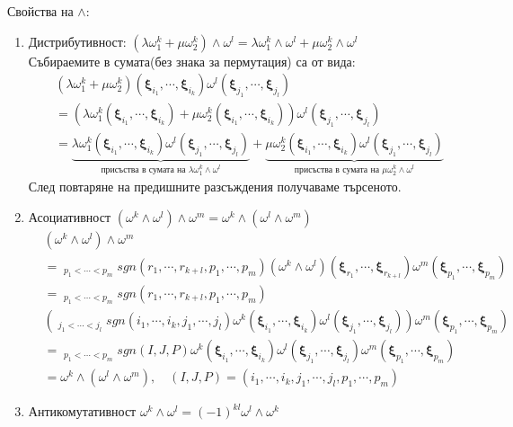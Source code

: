 \documentclass[12pt]{article}
\newcommand\myxi[0]{\boldsymbol{\xi}}
\begin{document}
\begin{large}
Свойства на $\wedge$:
\begin{enumerate}
  \item Дистрибутивност: $(\lambda\omega^k_1+\mu\omega^k_2) \wedge \omega^l = \lambda\omega^k_1\wedge\omega^l + \mu \omega^k_2\wedge\omega^l$ \\
  Събираемите в сумата(без знака за пермутация) са от вида:
  \begin{align*}
    &(\lambda\omega^k_1+\mu\omega^k_2)(\myxi_{i_1},\cdots,\myxi_{i_k})\omega^l(\myxi_{j_1},\cdots,\myxi_{j_l}) \\
    &=(\lambda\omega^k_1(\myxi_{i_1},\cdots,\myxi_{i_k})+\mu\omega^k_2(\myxi_{i_1},\cdots,\myxi_{i_k}))\omega^l(\myxi_{j_1},\cdots,\myxi_{j_l}) \\
    &=\underbrace{\lambda\omega^k_1(\myxi_{i_1},\cdots,\myxi_{i_k})\omega^l(\myxi_{j_1},\cdots,\myxi_{j_l})}_{\text{присъства в сумата на $\lambda\omega^k_1\wedge\omega^l$}}+
    \underbrace{\mu\omega^k_2(\myxi_{i_1},\cdots,\myxi_{i_k})\omega^l(\myxi_{j_1},\cdots,\myxi_{j_l})}_{\text{присъства в сумата на $\mu\omega^k_2\wedge\omega^l$}}
  \end{align*}
  След повтаряне на предишните разсъждения получаваме търсеното.
  \item Асоциативност $(\omega^k \wedge \omega^l) \wedge \omega^m=\omega^k \wedge (\omega^l \wedge \omega^m)$
  \begin{align*}
    &(\omega^k \wedge \omega^l) \wedge \omega^m  \\
    &=\mathop{\sum_{r_1<\cdots<r_{k+l}}}_{p_1<\cdots<p_m} sgn(r_1,\cdots,r_{k+l},p_1, \cdots,p_m)(\omega^k \wedge \omega^l)(\myxi_{r_1},\cdots,\myxi_{r_{k+l}})\omega^m(\myxi_{p_1},\cdots,\myxi_{p_m}) \\
    &=\mathop{\sum_{r_1<\cdots<r_{k+l}}}_{p_1<\cdots<p_m} sgn(r_1,\cdots,r_{k+l},p_1, \cdots,p_m) \\ &\left(\mathop{\sum_{i_1<\cdots<i_k}}_{j_1<\cdots<j_l} sgn(i_1,\cdots,i_k,j_1, \cdots,j_l)\omega^k(\myxi_{i_1},\cdots,\myxi_{i_k})\omega^l(\myxi_{j_1},\cdots,\myxi_{j_l}) \right)\omega^m(\myxi_{p_1},\cdots,\myxi_{p_m}) \\
    &=\mathop{\mathop{\sum_{i_1<\cdots<i_k}}_{j_1<\cdots<j_l}}_{p_1<\cdots<p_m} sgn(I,J,P) \omega^k(\myxi_{i_1},\cdots,\myxi_{i_k})\omega^l(\myxi_{j_1},\cdots,\myxi_{j_l})\omega^m(\myxi_{p_1},\cdots,\myxi_{p_m}) \\
    &= \omega^k \wedge (\omega^l \wedge \omega^m), \quad (I,J,P)=(i_1,\cdots,i_k,j_1,\cdots,j_l,p_1,\cdots,p_m)
  \end{align*}
  \item Антикомутативност $\omega^k \wedge \omega^l=(-1)^{kl}\omega^l \wedge \omega^k$

\end{enumerate}
\end{large}
\end{document}
